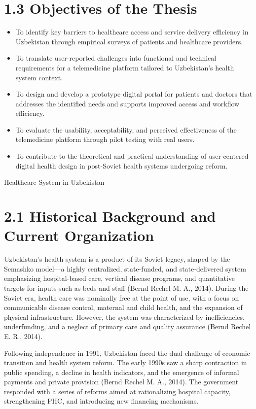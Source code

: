 \section{\texorpdfstring{\textbf{1.3 Objectives of the
Thesis}}{1.3 Objectives of the Thesis}}\label{objectives-of-the-thesis}

\begin{itemize}
\item
  To identify key barriers to healthcare access and service delivery
  efficiency in Uzbekistan through empirical surveys of patients and
  healthcare providers.
\item
  To translate user-reported challenges into functional and technical
  requirements for a telemedicine platform tailored to Uzbekistan's
  health system context.
\item
  To design and develop a prototype digital portal for patients and
  doctors that addresses the identified needs and supports improved
  access and workflow efficiency.
\item
  To evaluate the usability, acceptability, and perceived effectiveness
  of the telemedicine platform through pilot testing with real users.
\item
  To contribute to the theoretical and practical understanding of
  user-centered digital health design in post-Soviet health systems
  undergoing reform.
\end{itemize}

Healthcare System in Uzbekistan

\section{2.1 Historical Background and Current
Organization}\label{historical-background-and-current-organization}

Uzbekistan's health system is a product of its Soviet legacy, shaped by
the Semashko model---a highly centralized, state-funded, and
state-delivered system emphasizing hospital-based care, vertical disease
programs, and quantitative targets for inputs such as beds and staff
(Bernd Rechel M. A., 2014). During the Soviet era, health care was
nominally free at the point of use, with a focus on communicable disease
control, maternal and child health, and the expansion of physical
infrastructure. However, the system was characterized by inefficiencies,
underfunding, and a neglect of primary care and quality assurance (Bernd
Rechel E. R., 2014).

Following independence in 1991, Uzbekistan faced the dual challenge of
economic transition and health system reform. The early 1990s saw a
sharp contraction in public spending, a decline in health indicators,
and the emergence of informal payments and private provision (Bernd
Rechel M. A., 2014). The government responded with a series of reforms
aimed at rationalizing hospital capacity, strengthening PHC, and
introducing new financing mechanisms.

